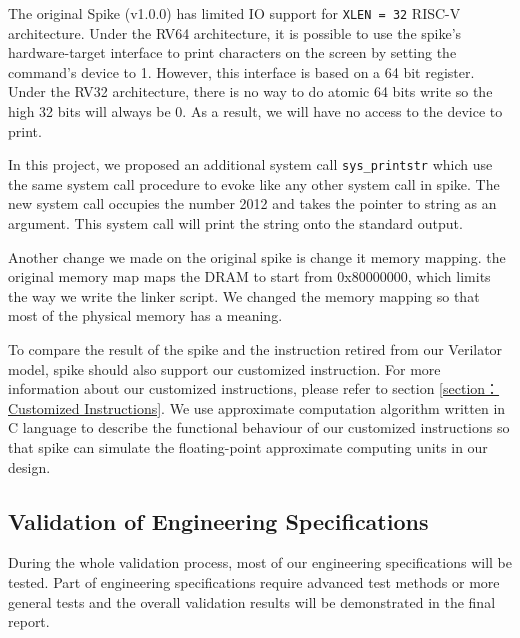 The original Spike (v1.0.0) has limited IO support for \texttt{XLEN = 32} RISC-V architecture. Under the RV64 architecture, it is possible to use the spike's hardware-target interface to print characters on the screen by setting the command's device to 1. However, this interface is based on a 64 bit register. Under the RV32 architecture, there is no way to do atomic 64 bits write so the high 32 bits will always be 0. As a result, we will have no access to the device to print.

In this project, we proposed an additional system call \texttt{sys\_printstr} which use the same system call procedure to evoke like any other system call in spike. The new system call occupies the number 2012 and takes the pointer to string as an argument. This system call will print the string onto the standard output.

Another change we made on the original spike is change it memory mapping. the original memory map maps the DRAM to start from 0x80000000, which limits the way we write the linker script. We changed the memory mapping so that most of the physical memory has a meaning.

To compare the result of the spike and the instruction retired from our Verilator model, spike should also support our customized instruction. For more information about our customized instructions, please refer to section \ref{section：Customized Instructions}. We use approximate computation algorithm written in C language to describe the functional behaviour of our customized instructions so that spike can simulate the floating-point approximate computing units in our design. 


\subsection{Validation of Engineering Specifications}
During the whole validation process, most of our engineering specifications will be tested. Part of engineering specifications require advanced test methods or more general tests and the overall validation results will be demonstrated in the final report.

